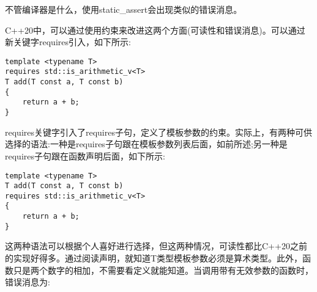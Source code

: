 不管编译器是什么，使用static\_assert会出现类似的错误消息。

C++20中，可以通过使用约束来改进这两个方面(可读性和错误消息)。可以通过新关键字requires引入，如下所示:

\begin{lstlisting}[style=styleCXX]
template <typename T>
requires std::is_arithmetic_v<T>
T add(T const a, T const b)
{
	return a + b;
}
\end{lstlisting}

requires关键字引入了requires子句，定义了模板参数的约束。实际上，有两种可供选择的语法:一种是requires子句跟在模板参数列表后面，如前所述;另一种是requires子句跟在函数声明后面，如下所示:

\begin{lstlisting}[style=styleCXX]
template <typename T>
T add(T const a, T const b)
requires std::is_arithmetic_v<T>
{
	return a + b;
}
\end{lstlisting}

这两种语法可以根据个人喜好进行选择，但这两种情况，可读性都比C++20之前的实现好得多。通过阅读声明，就知道T类型模板参数必须是算术类型。此外，函数只是两个数字的相加，不需要看定义就能知道。当调用带有无效参数的函数时，错误消息为:

